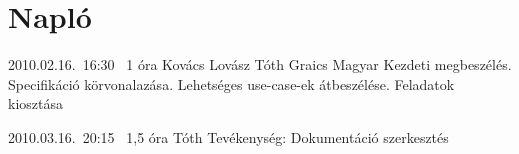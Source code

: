 %
\section{Napló}

\begin{naplo}

\bejegyzes
{2010.02.16.~16:30~} %
{1 óra} %
{Kovács\newline
Lovász\newline
Tóth\newline
Graics\newline
Magyar\newline
} %
{Kezdeti megbeszélés. Specifikáció körvonalazása. Lehetséges use-case-ek átbeszélése. Feladatok kiosztása} %

\bejegyzes
{2010.03.16.~20:15~}
{1,5 óra}
{Tóth}
{Tevékenység: Dokumentáció szerkesztés}
\end{naplo}


